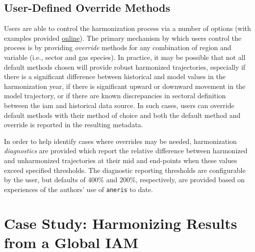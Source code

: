 \documentclass[review]{elsarticle}
\newcommand{\code}[1]{\lstinline[basicstyle=\ttfamily\color{black}]|#1|}
\begin{document}
\subsection{User-Defined Override Methods}\label{sec:overrides} 

Users are able to control the harmonization process via a number of options
(with examples provided
\href{http://mattgidden.com/aneris/config.html}{online}). The primary mechanism
by which users control the process is by providing \textit{override} methods for
any combination of region and variable (i.e., sector and gas species).  In
practice, it may be possible that not all default methods chosen will provide
robust harmonized trajectories, especially if there is a significant difference
between historical and model values in the harmonization year, if there is
significant upward or downward movement in the model trajectory, or if there are
known discrepancies in sectoral definition between the \gls{iam} and historical data
source. In such cases, users can override default methods with their method of
choice and both the default method and override is reported in the resulting
metadata.

In order to help identify cases where overrides may be needed, harmonization
\textit{diagnostics} are provided which report the relative difference between
harmonized and unharmonized trajectories at their mid and end-points when these
values exceed specified thresholds. The diagnostic reporting thresholds are
configurable by the user, but defaults of $400$\% and $200$\%, respectively, are
provided based on experiences of the authors' use of \code{aneris} to date.

\section{Case Study: Harmonizing Results from a Global IAM}\label{sec:results}
\end{document}
